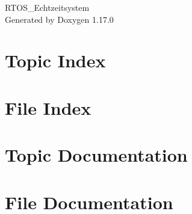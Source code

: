 \documentclass[twoside]{book}
\newcommand{\+}{\discretionary{\mbox{\scriptsize$\hookleftarrow$}}{}{}}
\newcommand{\clearemptydoublepage}{%
    \newpage{\pagestyle{empty}\cleardoublepage}%
  }
\begin{document}
  \raggedbottom
    \hypersetup{pageanchor=false,
                bookmarksnumbered=true,
                pdfencoding=unicode
               }
  \begin{titlepage}
  \vspace*{7cm}
  \begin{center}%
  {\Large RTOS\+\_\+\+Echtzeitsystem}\\
  \vspace*{1cm}
  {\large Generated by Doxygen 1.17.0}\\
  \end{center}
  \end{titlepage}
  \clearemptydoublepage
  \tableofcontents
  \clearemptydoublepage
  \hypersetup{pageanchor=true}
\chapter{Topic Index}

\chapter{File Index}

\chapter{Topic Documentation}

\chapter{File Documentation}









  \backmatter
  \newpage
  \clearemptydoublepage
  \printindex
\end{document}
